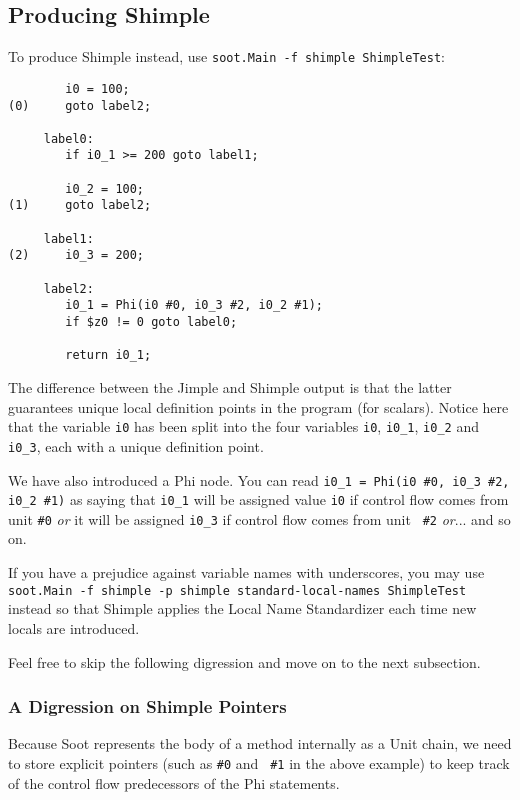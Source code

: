 \documentclass[10pt,letterpaper,oneside,onecolumn]{article}
\begin{document}
\subsection{Producing Shimple}

To produce Shimple instead, use {\tt soot.Main -f shimple ShimpleTest}:

\begin{verbatim}
        i0 = 100;
(0)     goto label2;

     label0:
        if i0_1 >= 200 goto label1;

        i0_2 = 100;
(1)     goto label2;

     label1:
(2)     i0_3 = 200;

     label2:
        i0_1 = Phi(i0 #0, i0_3 #2, i0_2 #1);
        if $z0 != 0 goto label0;

        return i0_1;
\end{verbatim}

The difference between the Jimple and Shimple output is that the
latter guarantees unique local definition points in the program (for
scalars).  Notice here that the variable {\tt i0} has been split into
the four variables {\tt i0}, {\tt i0\_1}, {\tt i0\_2} and {\tt i0\_3},
each with a unique definition point.

We have also introduced a Phi node.  You can read {\tt i0\_1 = Phi(i0
\#0, i0\_3 \#2, i0\_2 \#1)} as saying that {\tt i0\_1} will be assigned
value {\tt i0} if control flow comes from unit {\tt \#0} {\em or} it
will be assigned {\tt i0\_3} if control flow comes from unit {\tt
\#2} {\em or}... and so on.

If you have a prejudice against variable names with underscores, you
may use {\tt soot.Main -f shimple -p shimple standard-local-names
ShimpleTest} instead so that Shimple applies the Local Name
Standardizer each time new locals are introduced.

Feel free to skip the following digression and move on to the next
subsection.

\subsubsection{A Digression on Shimple Pointers}

Because Soot represents the body of a method internally as a Unit
chain, we need to store explicit pointers (such as {\tt \#0} and {\tt
\#1} in the above example) to keep track of the control flow
predecessors of the Phi statements.
\end{document}
